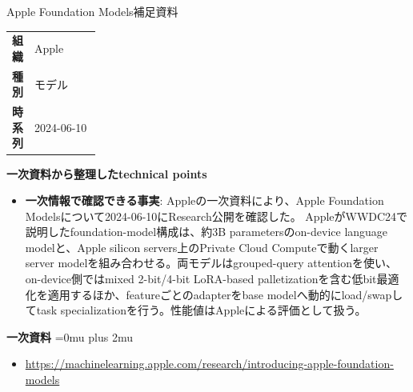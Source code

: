 \Needspace{0.38\textheight}
\begin{technicalnote}{Apple Foundation Models}{補足資料}
\begingroup
\begin{tabularx}{\linewidth}{@{}>{\bfseries}p{0.22\linewidth}X@{}}
組織 & Apple \\
種別 & モデル \\
時系列 & 2024-06-10 \\
\end{tabularx}
\smallskip
{\bfseries 一次資料から整理したtechnical points}
\begin{itemize}[leftmargin=1.5em,itemsep=0.35em]
\item \textbf{一次情報で確認できる事実}: Appleの一次資料により、Apple Foundation Modelsについて2024-06-10にResearch公開を確認した。 AppleがWWDC24で説明したfoundation-model構成は、約3B parametersのon-device language modelと、Apple silicon servers上のPrivate Cloud Computeで動くlarger server modelを組み合わせる。両モデルはgrouped-query attentionを使い、on-device側ではmixed 2-bit/4-bit LoRA-based palletizationを含む低bit最適化を適用するほか、featureごとのadapterをbase modelへ動的にload/swapしてtask specializationを行う。性能値はAppleによる評価として扱う。
\end{itemize}
\begin{minipage}{\linewidth}
\begin{samepage}
{\bfseries 一次資料}
\begingroup\sloppy
\Urlmuskip=0mu plus 2mu\relax
\begin{itemize}[leftmargin=1.5em,itemsep=0.25em]
\item {\scriptsize\url{https://machinelearning.apple.com/research/introducing-apple-foundation-models}}
\end{itemize}
\endgroup
\end{samepage}
\end{minipage}
\endgroup
\end{technicalnote}
\medskip

